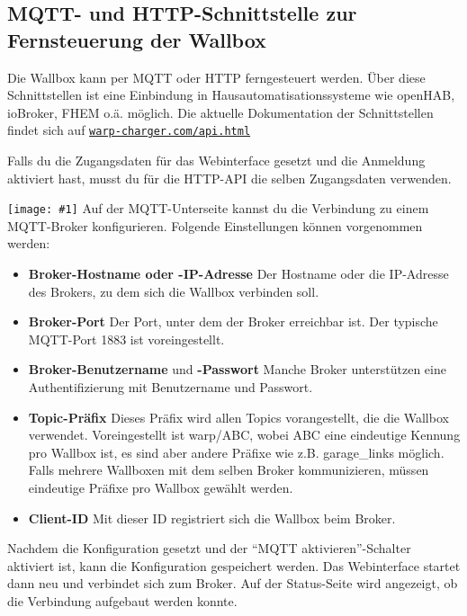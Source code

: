 \documentclass[a4paper,10pt]{article}
\newcommand{\gfx}[1]{\texttt{[image: \#1]}}
\newcommand\rurl[2]{%
  \href{#1}{\nolinkurl{#2}}%
}
\begin{document}
\begin{multicols*}{2}
	\newpage
	\section{MQTT- und HTTP-Schnittstelle zur Fernsteuerung der Wallbox}
	Die Wallbox kann per MQTT oder HTTP ferngesteuert werden. Über diese Schnittstellen ist eine
	Einbindung in Hausautomatisationssysteme wie openHAB, ioBroker, FHEM o.ä. möglich. Die aktuelle
	Dokumentation der Schnittstellen findet sich auf \rurl{https://warp-charger.com/api.html}{warp-charger.com/api.html}

	Falls du die Zugangsdaten für das Webinterface gesetzt und die Anmeldung aktiviert hast, musst du
	für die HTTP-API die selben Zugangsdaten verwenden.

	\gfx{./img_warp2/resized/web_mqtt}
	Auf der MQTT-Unterseite kannst du die Verbindung zu einem MQTT-Broker konfigurieren. Folgende Einstellungen können vorgenommen werden:
	\begin{itemize}
		\item \textbf{Broker-Hostname oder -IP-Adresse} Der Host\-name oder die IP-Adresse des Brokers, zu dem sich die Wallbox verbinden soll.
		\item \textbf{Broker-Port} Der Port, unter dem der Broker erreichbar ist. Der typische MQTT-Port 1883 ist voreingestellt.
		\item \textbf{Broker-Benutzername} und \textbf{-Passwort} Manche Broker unterstützen eine Authentifizierung mit Benutzername und Passwort.
		\item \textbf{Topic-Präfix} Dieses Präfix wird allen Topics vorangestellt, die die Wallbox verwendet.
		      Voreingestellt ist warp/ABC, wobei ABC eine eindeutige Kennung pro Wallbox ist,
		      es sind aber andere Präfixe wie z.B. garage\_links möglich.
		      Falls mehrere Wallboxen mit dem selben Broker kommunizieren,
		      müssen eindeutige Präfixe pro Wallbox gewählt werden.
		\item \textbf{Client-ID} Mit dieser ID registriert sich die Wallbox beim Broker.
	\end{itemize}
	Nachdem die Konfiguration gesetzt und der \enquote{MQTT aktivieren}-Schalter aktiviert ist, kann die Konfiguration gespeichert werden.
	Das Webinterface startet dann neu und verbindet sich zum Broker.
	Auf der Status-Seite wird angezeigt, ob die Verbindung aufgebaut werden konnte.

	\newpage

\end{multicols*}
\end{document}
